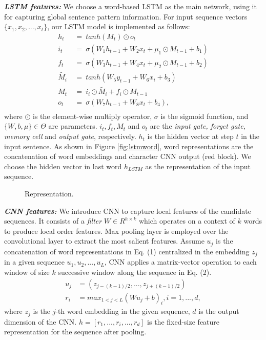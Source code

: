 \documentclass[11pt,a4paper]{article}
\begin{document}
\textit{\textbf{LSTM features:}} We choose a word-based LSTM as the main network, using it for capturing global sentence pattern information.
For input sequence vectors $\{x_1,x_2,...,x_t\}$, our LSTM model is implemented as follows:
\begin{equation*}
\begin{aligned}
h_t& \:=\:tanh(M_t)\odot o_t\\
i_t&\:=\:\sigma(W_1h_{t-1}+W_2x_t+\mu_1 \odot M_{t-1}+b_1)\\
f_t&\:=\:\sigma(W_3h_{t-1}+W_4x_t+\mu_2 \odot M_{t-1}+b_2)\\
\widetilde{M_i}&\:=\:tanh(W_5y_{t-1}+W_6x_i+b_3)\\
M_t&\:=\:i_i\odot\widetilde{M_i}+f_i\odot M_{t-1}\\
o_t&\:=\:\sigma(W_7h_{t-1}+W_8x_t +b_4),\\
\end{aligned}
\end{equation*}
where $\odot$ is the element-wise multiply operator, $\sigma$ is the sigmoid function, and $\{W,b,\mu\} \in \Theta$ are parameters. $i_t, f_t, M_t$ and $o_t$ are the \textit{input gate, forget gate, memory cell} and \textit{output gate}, respectively. $h_t$ is the hidden vector at step $t$ in the input sentence.
As shown in Figure \ref{fig:lstmword}, word representations are the concatenation of word embeddings and character CNN output (red block). We choose the hidden vector in last word $h_{LSTM}$ as the representation of the input sequence. 

\begin{figure}[!t] 
  \centering 
  \caption{Representation.} 
  \label{representation} \end{figure}

\textit{\textbf{CNN features:}} We introduce CNN to capture local features of the candidate sequences. It consists of a \textit{filter} 
$W \in R^{h\times k}$ which operates on a context of $k$ words
to produce local order features. Max pooling layer is employed over the convolutional layer to 
extract the most salient features. Assume $u_j$ is the concatenation of word representations in Eq. (1) centralized in the embedding $z_j$ in a given sequence $u_1, u_2, ..., u_L$,
CNN applies a matrix-vector operation to each window of size $k$ successive window along the sequence in Eq. (2).
\begin{align}
u_j &= (z_{j-(k-1)/2}, ..., z_{j+(k-1)/2}) \\
r_i &= max_{1<j<L} {(W u_j  + b)_i}, i=1, ..., d ,
\end{align}
where $z_j$ is the $j$-th word embedding in the given sequence,
$d$ is the output dimension of the CNN. $h=[r_1, ..., r_i,..., r_d]$ is the fixed-size
feature representation for the sequence after pooling.
\end{document}

